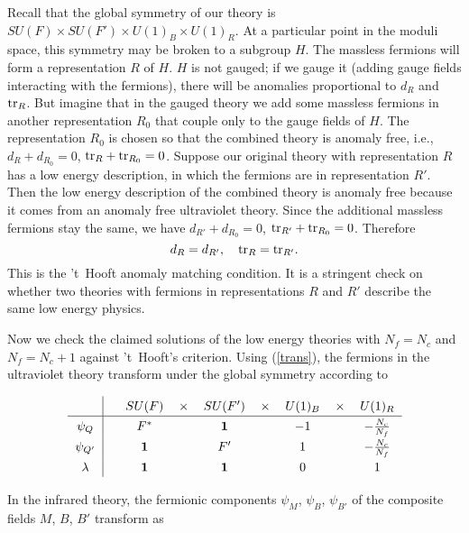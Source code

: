 \documentclass[lecture]{qft-l}
\newcommand{\lam}{\lambda}
\newcommand{\one}{\mathbf{1}}
\newcommand{\tr}{{\rm tr}}
\newcommand{\FT}{F'}%
\newcommand{\QT}{Q'}%
\newcommand{\BT}{B'}%
\newcommand{\GLOBAL}{SU(F)\times SU(\FT)\times U(1)_B\times U(1)_R}
\numberwithin{figure}{chapter}
\begin{document}
Recall that the global symmetry of our theory is $\GLOBAL$.
At a particular point in the moduli space, this symmetry may be broken to
a subgroup $H$.
The massless fermions will form a representation $R$ of $H$.
$H$ is not gauged; if we gauge it (adding gauge fields interacting with the
fermions), there will be anomalies proportional to $d_R$ and $\tr_R$.
But imagine that in the gauged theory we add some massless fermions in another 
representation $R_0$ that couple only to the gauge fields of $H$.
The representation $R_0$ is chosen so that the combined theory is anomaly free,
i.e., $d_R+d_{R_0}=0$, $\tr_R+\tr_{R_0}=0$.
Suppose our original theory with representation $R$ has a low energy 
description, in which the fermions are in representation $R'$.
Then the low energy description of the combined theory is anomaly free 
because it comes from an anomaly free ultraviolet theory.
Since the additional massless fermions stay the same, we have
$d_{R'}+d_{R_0}=0$, $\tr_{R'}+\tr_{R_0}=0$.
Therefore
	\begin{equation}\label{thooft}
d_R=d_{R'}, \quad \tr_R=\tr_{R'}.
	\end{equation}
This is the 't~Hooft anomaly matching condition.
It is a stringent check on whether two theories with fermions in 
representations $R$ and $R'$ describe the same low energy physics.

Now we check the claimed solutions of the low energy theories with $N_f=N_c$
and $N_f=N_c+1$ against 't~Hooft's criterion.
Using (\ref{trans}), 
the fermions in the ultraviolet theory transform 
under the global symmetry according to

\bigskip
\begin{equation}
\renewcommand{\arraystretch}{1.3}
\begin{tabular}{c|cccccccc}\label{electran}
&&    $SU(F)$	&$\times$&  $SU(\FT)$	&$\times$&    $U(1)_B$
&$\times$ &$U(1)_R$	\\
	\hline
$\psi_Q$&&  $F^*$ &	&   $\one$	&	&    $-1$
	&	&    $-\frac{N_c}{N_f}$				\\
$\psi_{\QT}$&&  $\one$	& &   $\FT$	&	&    $1$
	&	&    $-\frac{N_c}{N_f}$				\\
$\lam$	&&    $\one$ &	&   $\one$	&	&    $0$
	&	&      $1$
\end{tabular}
\end{equation}

\bigskip\noindent
In the infrared theory, the fermionic components $\psi_M$, $\psi_B$,
$\psi_{\BT}$ of the composite fields $M$, $B$, $\BT$ transform as
\end{document}
